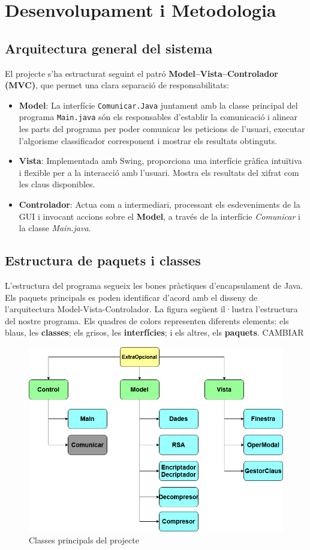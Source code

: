 \documentclass{ieeetj}
\begin{document}
\section{Desenvolupament i Metodologia}

\subsection{Arquitectura general del sistema}
El projecte s'ha estructurat seguint el patró \textbf{Model–Vista–Controlador (MVC)}, que permet una clara separació de responsabilitats:
\begin{itemize}
    \item \textbf{Model}: La interfície \texttt{Comunicar.Java} juntament amb la classe principal del programa \texttt{Main.java} són els responsables d'establir la comunicació i alinear les parts del programa per poder comunicar les peticions de l'usuari, executar l'algorisme classificador corresponent i mostrar els resultats obtinguts.
    
    \item \textbf{Vista}: Implementada amb Swing, proporciona una interfície gràfica intuïtiva i flexible per a la interacció amb l'usuari. Mostra els resultats del xifrat com les claus disponibles. 

\item \textbf{Controlador}: Actua com a intermediari, processant els esdeveniments de la GUI i invocant accions sobre el \textbf{Model}, a través de la interfície \textit{Comunicar} i la classe \textit{Main.java}.

\end{itemize}
\subsection{Estructura de paquets i classes}
L'estructura del programa segueix les bones pràctiques d'encapsulament de Java. 
Els paquets principals es poden identificar d'acord amb el disseny de l'arquitectura Model-Vista-Controlador. 
La figura següent il·lustra l'estructura del nostre programa. \newline
Els quadres de colors representen diferents elements: \textcolor{blau}{els blaus}, les \textbf{classes}; \textcolor{gris}{els grisos}, les \textbf{interfícies};\textcolor{verd}{ i els altres}, els \textbf{paquets}. CAMBIAR

\begin{figure}[H]
    \centering
    \includegraphics[width=0.5\linewidth]{png/praExtra.png}
    \caption{Classes principals del projecte}
    \label{fig:enter-label}
\end{figure}
\end{document}
